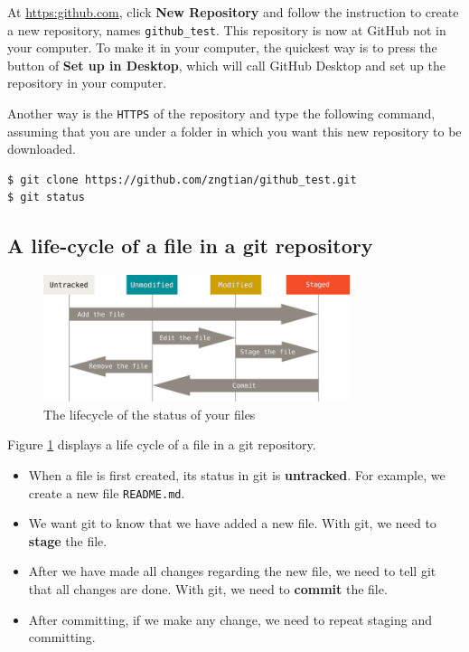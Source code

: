 \documentclass[a4paper,11pt]{article}
\begin{document}
At \url{https:github.com}, click \textbf{New Repository} and follow the instruction
to create a new repository, names \texttt{github\_test}. This repository is
now at GitHub not in your computer. To make it in your computer, the
quickest way is to press the button of \textbf{Set up in Desktop}, which will
call GitHub Desktop and set up the repository in your computer.

Another way is the \texttt{HTTPS} of the repository and type the following
command, assuming that you are under a folder in which you want this new
repository to be downloaded.

\begin{verbatim}
$ git clone https://github.com/zngtian/github_test.git
$ git status
\end{verbatim}


\subsection{A life-cycle of a file in a git repository}
\label{sec:orgd44358f}

\begin{figure}[htbp]
\centering
\includegraphics[width=0.8\textwidth]{img/lifecycle.png}
\caption{\label{fig:org98f3548}
The lifecycle of the status of your files}
\end{figure}

Figure \ref{fig:org98f3548}  displays a life cycle of a file in a git
repository.
\begin{itemize}
\item When a file is first created, its status in git is \textbf{untracked}. For
example, we create a new file \texttt{README.md}.
\item We want git to know that we have added a new file. With git, we need
to \textbf{stage} the file.
\item After we have made all changes regarding the new file, we need to
tell git that all changes are done. With git, we need to \textbf{commit}
the file.
\item After committing, if we make any change, we need to repeat staging
and committing.
\end{itemize}
\end{document}
